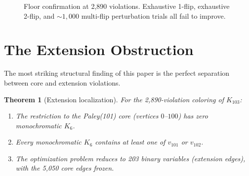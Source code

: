 \documentclass[11pt,a4paper]{article}
\theoremstyle{plain}
\newtheorem{theorem}{Theorem}[section]
\theoremstyle{remark}
\begin{document}
\begin{figure}[H]
\centering
{}
\caption{Floor confirmation at 2{,}890 violations. Exhaustive 1-flip,
  exhaustive 2-flip, and ${\sim}1{,}000$ multi-flip perturbation
  trials all fail to improve.}
\label{fig:floor}
\end{figure}

\section{The Extension Obstruction}
\label{sec:obstruction}

The most striking structural finding of this paper is the perfect
separation between core and extension violations.

\begin{theorem}[Extension localization]\label{thm:extension}
For the 2{,}890-violation coloring of $K_{103}$:
\begin{enumerate}[leftmargin=2em]
  \item The restriction to the Paley(101) core (vertices $0$--$100$)
    has zero monochromatic $K_6$.
  \item Every monochromatic $K_6$ contains at least one of $v_{101}$
    or $v_{102}$.
  \item The optimization problem reduces to 203 binary variables
    (extension edges), with the 5{,}050 core edges frozen.
\end{enumerate}
\end{theorem}
\end{document}
